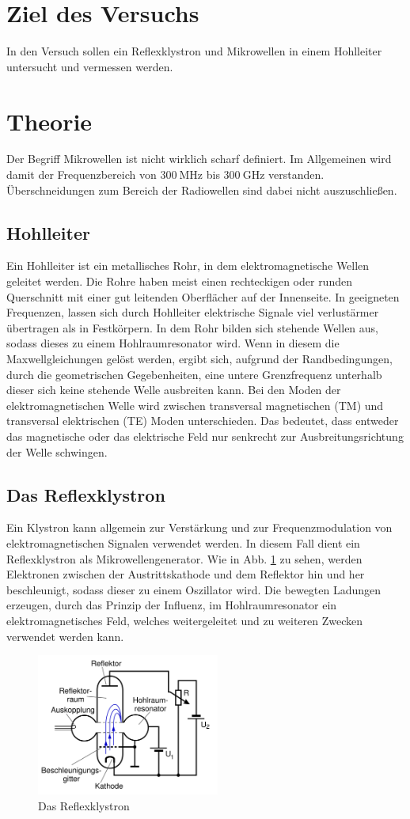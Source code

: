 \section{Ziel des Versuchs}
In den Versuch sollen ein Reflexklystron und Mikrowellen in einem Hohlleiter untersucht und vermessen werden.
\section{Theorie}
\label{sec:Theorie}
\nocite{skript}
Der Begriff Mikrowellen ist nicht wirklich scharf definiert. Im Allgemeinen wird damit der Frequenzbereich von $\SI{300}{\mega\hertz}$ bis $\SI{300}{\giga\hertz}$ verstanden. Überschneidungen zum Bereich der Radiowellen sind dabei nicht auszuschließen.
\subsection{Hohlleiter}
Ein Hohlleiter ist ein metallisches Rohr, in dem elektromagnetische Wellen geleitet werden. Die Rohre haben meist einen rechteckigen oder runden Querschnitt mit einer gut leitenden Oberflächer auf der Innenseite.
In geeigneten Frequenzen, lassen sich durch Hohlleiter elektrische Signale viel verlustärmer übertragen als in Festkörpern.
In dem Rohr bilden sich stehende Wellen aus, sodass dieses zu einem Hohlraumresonator wird. Wenn in diesem die Maxwellgleichungen gelöst werden, ergibt sich, aufgrund der Randbedingungen, durch die geometrischen Gegebenheiten, eine untere Grenzfrequenz unterhalb dieser sich keine stehende Welle ausbreiten kann.
Bei den Moden der elektromagnetischen Welle wird zwischen transversal magnetischen (TM) und transversal elektrischen (TE) Moden unterschieden. Das bedeutet, dass entweder das magnetische oder das elektrische Feld nur senkrecht zur Ausbreitungsrichtung der Welle schwingen.
\subsection{Das Reflexklystron}
Ein Klystron kann allgemein zur Verstärkung und zur Frequenzmodulation von elektromagnetischen Signalen verwendet werden. In diesem Fall dient ein Reflexklystron als Mikrowellengenerator. Wie in Abb. \ref{fig:kly} zu sehen, werden Elektronen zwischen der Austrittskathode und dem Reflektor hin und her beschleunigt, sodass dieser zu einem Oszillator wird. Die bewegten Ladungen erzeugen, durch das Prinzip der Influenz, im Hohlraumresonator ein elektromagnetisches Feld, welches weitergeleitet und zu weiteren Zwecken verwendet werden kann.
\begin{figure}
	\centering
	\includegraphics[width=6cm]{graphics/kly.png}
	\caption{Das Reflexklystron}
	\label{fig:kly}
\end{figure}
